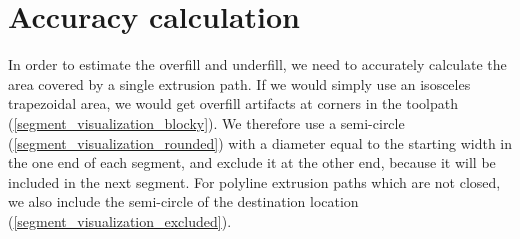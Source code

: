 \section{Accuracy calculation}\label{accuracy_calculation}


In order to estimate the overfill and underfill, we need to accurately calculate the area covered by a single extrusion path.
If we would simply use an isosceles trapezoidal area, we would get overfill artifacts at corners in the toolpath (\cref{segment_visualization_blocky}).
We therefore use a semi-circle (\cref{segment_visualization_rounded}) with a diameter equal to the starting width in the one end of each segment, and exclude it at the other end, because it will be included in the next segment.
For polyline extrusion paths which are not closed, we also include the semi-circle of the destination location (\cref{segment_visualization_excluded}).


